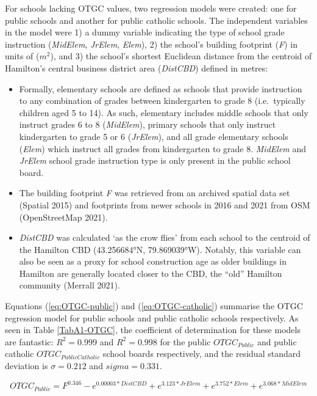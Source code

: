 \documentclass[
default
]{sn-jnl}
\providecommand{\tightlist}{%
  \setlength{\itemsep}{0pt}\setlength{\parskip}{0pt}}\usepackage{longtable,booktabs,array}
\begin{document}
For schools lacking OTGC values, two regression models were created: one
for public schools and another for public catholic schools. The
independent variables in the model were 1) a dummy variable indicating
the type of school grade instruction (\emph{MidElem}, \emph{JrElem},
\emph{Elem}), 2) the school's building footprint (\emph{F}) in units of
(\(m^2\)), and 3) the school's shortest Euclidean distance from the
centroid of Hamilton's central business district area (\emph{DistCBD})
defined in metres:

\begin{itemize}
\tightlist
\item
  Formally, elementary schools are defined as schools that provide
  instruction to any combination of grades between kindergarten to grade
  8 (i.e.~typically children aged 5 to 14). As such, elementary includes
  middle schools that only instruct grades 6 to 8 (\emph{MidElem}),
  primary schools that only instruct kindergarten to grade 5 or 6
  (\emph{JrElem}), and all grade elementary schools (\emph{Elem}) which
  instruct all grades from kindergarten to grade 8. \emph{MidElem} and
  \emph{JrElem} school grade instruction type is only present in the
  public school board.
\item
  The building footprint \emph{F} was retrieved from an archived spatial
  data set (Spatial 2015) and footprints from newer schools in 2016 and
  2021 from OSM (OpenStreetMap 2021).
\item
  \emph{DistCBD} was calculated `as the crow flies' from each school to
  the centroid of the Hamilton CBD (43.256684°N, 79.869039°W). Notably,
  this variable can also be seen as a proxy for school construction age
  as older buildings in Hamilton are generally located closer to the
  CBD, the ``old'' Hamilton community (Merrall 2021).
\end{itemize}

Equations (\ref{eq:OTGC-public}) and (\ref{eq:OTGC-catholic}) summarise
the OTGC regression model for public schools and public catholic schools
respectively. As seen in Table \ref{TabA1-OTGC}, the coefficient of
determination for these models are fantastic: \(R^2 = 0.999\) and
\(R^2 = 0.998\) for the public \(OTGC_{Public}\) and public catholic
\(OTGC_{Public Catholic}\) school boards respectively, and the residual
standard deviation is \(\sigma = 0.212\) and \(sigma = 0.331\).

\begin{equation}
\label{eq:OTGC-public}
OTGC_{Public} = F^{0.346}-e^{0.00003*DistCBD}+e^{3.123*JrElem}+e^{3.752*Elem}+ e^{3.068*MidElem} 
\end{equation}
\end{document}
